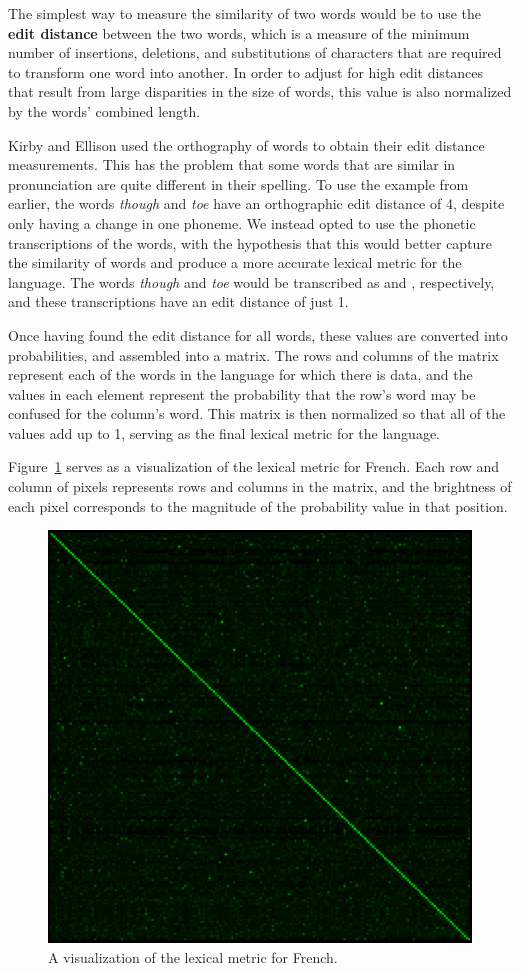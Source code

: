 \documentclass[10pt,a4]{article}
\begin{document}
The simplest way to measure the similarity of two words would be to use the \textbf{edit distance} between the two words, which is a measure of the minimum number of insertions, deletions, and substitutions of characters that are required to transform one word into another.  In order to adjust for high edit distances that result from large disparities in the size of words, this value is also normalized by the words' combined length.

Kirby and Ellison used the orthography of words to obtain their edit distance measurements.  This has the problem that some words that are similar in pronunciation are quite different in their spelling.  To use the example from earlier, the words \textit{though} and \textit{toe} have an orthographic edit distance of 4, despite only having a change in one phoneme.  We instead opted to use the phonetic transcriptions of the words, with the hypothesis that this would better capture the similarity of words and produce a more accurate lexical metric for the language.  The words \textit{though} and \textit{toe} would be transcribed as \textipa{[Do:]} and \textipa{[to:]}, respectively, and these transcriptions have an edit distance of just 1.

Once having found the edit distance for all words, these values are converted into probabilities, and assembled into a matrix.  The rows and columns of the matrix represent each of the words in the language for which there is data, and the values in each element represent the probability that the row's word may be confused for the column's word.  This matrix is then normalized so that all of the values add up to 1, serving as the final lexical metric for the language.

Figure~\ref{fig:french} serves as a visualization of the lexical metric for French.  Each row and column of pixels represents rows and columns in the matrix, and the brightness of each pixel corresponds to the magnitude of the probability value in that position.

\begin{figure}[ht]
\centering
\includegraphics[width=0.8\linewidth]{french3}
\caption{A visualization of the lexical metric for French.}
\label{fig:french}
\end{figure}
\end{document}

